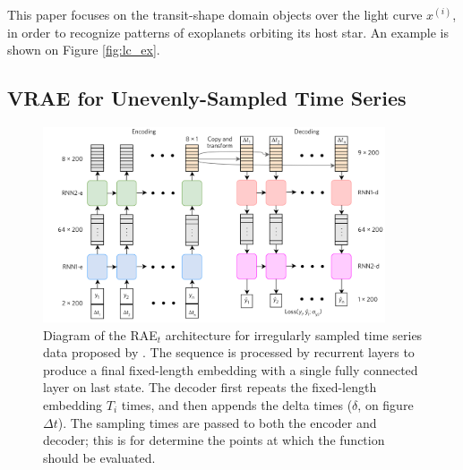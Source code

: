 This paper focuses on the transit-shape domain objects over the light curve $x^{(i)}$, in order to recognize patterns of exoplanets orbiting its host star. An example is shown on Figure \ref{fig:lc_ex}.

\subsection{VRAE for Unevenly-Sampled Time Series}

\begin{figure}[!t]
    \centering
    \includegraphics[width=0.9\textwidth]{imgs/BNaul_model.png}
    \caption{Diagram of the RAE$_t$ architecture for irregularly sampled time series data proposed by \citep{naul2018recurrent}. The sequence is processed by recurrent layers to produce a final fixed-length embedding with a single fully connected layer on last state. The decoder first repeats the fixed-length embedding $T_i$ times, and then appends the delta times ($\delta$, on figure $\Delta t$). The sampling times are passed to both the encoder and decoder; this is for determine the points at which the function should be evaluated.}
    \label{arch:bnaul}
\end{figure}

